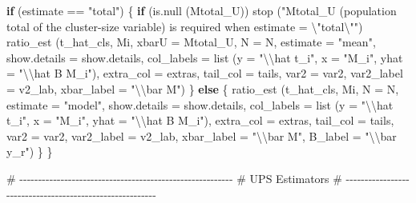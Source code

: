 \documentclass[
  letterpaper,
  DIV=11,
  numbers=noendperiod]{scrreprt}
\newenvironment{Shaded}{\begin{snugshade}}{\end{snugshade}}
\newcommand{\AttributeTok}[1]{\textcolor[rgb]{0.40,0.45,0.13}{#1}}
\newcommand{\CommentTok}[1]{\textcolor[rgb]{0.37,0.37,0.37}{#1}}
\newcommand{\ControlFlowTok}[1]{\textcolor[rgb]{0.00,0.23,0.31}{\textbf{#1}}}
\newcommand{\FunctionTok}[1]{\textcolor[rgb]{0.28,0.35,0.67}{#1}}
\newcommand{\NormalTok}[1]{\textcolor[rgb]{0.00,0.23,0.31}{#1}}
\newcommand{\SpecialCharTok}[1]{\textcolor[rgb]{0.37,0.37,0.37}{#1}}
\newcommand{\StringTok}[1]{\textcolor[rgb]{0.13,0.47,0.30}{#1}}
\renewcommand{\[}{\begin{equation}}
\renewcommand{\]}{\end{equation}}
\begin{document}
\begin{Shaded}
\begin{Highlighting}[]
  \ControlFlowTok{if}\NormalTok{ (estimate }\SpecialCharTok{==} \StringTok{"total"}\NormalTok{)}
\NormalTok{  \{}
      \ControlFlowTok{if}\NormalTok{ (}\FunctionTok{is.null}\NormalTok{ (Mtotal\_U))}
          \FunctionTok{stop}\NormalTok{ (}\StringTok{"Mtotal\_U (population total of the cluster{-}size variable) is required when estimate = }\SpecialCharTok{\textbackslash{}"}\StringTok{total}\SpecialCharTok{\textbackslash{}"}\StringTok{"}\NormalTok{)}
      \FunctionTok{ratio\_est}\NormalTok{ (t\_hat\_cls, Mi, }\AttributeTok{xbarU =}\NormalTok{ Mtotal\_U, }\AttributeTok{N =}\NormalTok{ N, }\AttributeTok{estimate =} \StringTok{"mean"}\NormalTok{, }\AttributeTok{show.details =}\NormalTok{ show.details,}
                 \AttributeTok{col\_labels =} \FunctionTok{list}\NormalTok{ (}\AttributeTok{y =} \StringTok{"}\SpecialCharTok{\textbackslash{}\textbackslash{}}\StringTok{hat t\_i"}\NormalTok{, }\AttributeTok{x =} \StringTok{"M\_i"}\NormalTok{, }\AttributeTok{yhat =} \StringTok{"}\SpecialCharTok{\textbackslash{}\textbackslash{}}\StringTok{hat B M\_i"}\NormalTok{),}
                 \AttributeTok{extra\_col =}\NormalTok{ extras, }\AttributeTok{tail\_col =}\NormalTok{ tails, }\AttributeTok{var2 =}\NormalTok{ var2, }\AttributeTok{var2\_label =}\NormalTok{ v2\_lab,}
                 \AttributeTok{xbar\_label =} \StringTok{"}\SpecialCharTok{\textbackslash{}\textbackslash{}}\StringTok{bar M"}\NormalTok{)}
\NormalTok{  \}}
  \ControlFlowTok{else}
\NormalTok{  \{}
      \FunctionTok{ratio\_est}\NormalTok{ (t\_hat\_cls, Mi, }\AttributeTok{N =}\NormalTok{ N, }\AttributeTok{estimate =} \StringTok{"model"}\NormalTok{, }\AttributeTok{show.details =}\NormalTok{ show.details,}
                 \AttributeTok{col\_labels =} \FunctionTok{list}\NormalTok{ (}\AttributeTok{y =} \StringTok{"}\SpecialCharTok{\textbackslash{}\textbackslash{}}\StringTok{hat t\_i"}\NormalTok{, }\AttributeTok{x =} \StringTok{"M\_i"}\NormalTok{, }\AttributeTok{yhat =} \StringTok{"}\SpecialCharTok{\textbackslash{}\textbackslash{}}\StringTok{hat B M\_i"}\NormalTok{),}
                 \AttributeTok{extra\_col =}\NormalTok{ extras, }\AttributeTok{tail\_col =}\NormalTok{ tails, }\AttributeTok{var2 =}\NormalTok{ var2, }\AttributeTok{var2\_label =}\NormalTok{ v2\_lab,}
                 \AttributeTok{xbar\_label =} \StringTok{"}\SpecialCharTok{\textbackslash{}\textbackslash{}}\StringTok{bar M"}\NormalTok{, }\AttributeTok{B\_label =} \StringTok{"}\SpecialCharTok{\textbackslash{}\textbackslash{}}\StringTok{bar y\_r"}\NormalTok{)}
\NormalTok{  \}}
\NormalTok{\}}

\CommentTok{\# {-}{-}{-}{-}{-}{-}{-}{-}{-}{-}{-}{-}{-}{-}{-}{-}{-}{-}{-}{-}{-}{-}{-}{-}{-}{-}{-}{-}{-}{-}{-}{-}{-}{-}{-}{-}{-}{-}{-}{-}{-}{-}{-}{-}{-}{-}{-}{-}{-}{-}{-}{-}{-}{-}{-}{-}{-}}
\CommentTok{\# UPS Estimators}
\CommentTok{\# {-}{-}{-}{-}{-}{-}{-}{-}{-}{-}{-}{-}{-}{-}{-}{-}{-}{-}{-}{-}{-}{-}{-}{-}{-}{-}{-}{-}{-}{-}{-}{-}{-}{-}{-}{-}{-}{-}{-}{-}{-}{-}{-}{-}{-}{-}{-}{-}{-}{-}{-}{-}{-}{-}{-}{-}{-}}


\end{Highlighting}
\end{Shaded}
\end{document}
